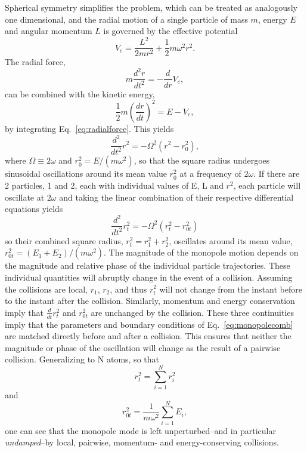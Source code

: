\documentclass[%
 reprint,
 amsmath,amssymb,
 aps,
]{revtex4-1}
\begin{document}
Spherical symmetry simplifies the problem, which can be treated as analogously one dimensional, and the radial motion of a single particle of mass $m$, energy $E$ and angular momentum $L$ is governed by the effective potential
\begin{equation}
V_e = \frac{L^2}{2mr^2}+\frac{1}{2}m\omega^2r^2.
\end{equation}
The radial force,
\begin{equation}
m\frac{d^2r}{dt^2} = -\frac{d}{dr}V_e,
\label{eq:radialforce}
\end{equation}
can be combined with the kinetic energy,
\begin{equation}
\frac{1}{2}m\left(\frac{dr}{dt}\right)^2 = E-V_e,
\end{equation}
by integrating Eq.~\ref{eq:radialforce}. This yields
\begin{equation}
\frac{d^2}{dt^2}r^2 = -\Omega^2\left(r^2-r_0^2\right),
\end{equation}
where $\Omega\equiv2\omega$ and $r_0^2=E/(m\omega^2)$, so that the square radius undergoes sinusoidal oscillations around its mean value $r_0^2$ at a frequency of $2\omega$. If there are 2 particles, 1 and 2, each with individual values of E, L and $r^2$, each particle will oscillate at $2\omega$ and taking the linear combination of their respective differential equations yields
\begin{equation}
\frac{d^2}{dt^2}r_t^2 = -\Omega^2\left(r_t^2-r_{0t}^2\right)
\label{eq:monopolecomb}
\end{equation}
so their combined square radius, $r_t^2 = r_1^2+r_2^2$, oscillates around its mean value, $r_{0t}^2 = (E_1+E_2)/(m\omega^2)$. The magnitude of the monopole motion depends on the magnitude and relative phase of the individual particle trajectories. These individual quantities will abruptly change in the event of a collision. Assuming the collisions are local, $r_1$, $r_2$, and thus $r_t^2$ will not change from the instant before to the instant after the collision. Similarly, momentum and energy conservation imply that $\frac{d}{dt}r_t^2$ and $r_{0t}^2$ are unchanged by the collision. These three continuities imply that the parameters and boundary conditions of Eq.~\ref{eq:monopolecomb} are matched directly before and after a collision. This ensures that neither the magnitude or phase of the oscillation will change as the result of a pairwise collision. Generalizing to N atoms, so that
\begin{equation}
r_t^2 = \sum_{i=1}^Nr_i^2
\end{equation}
and
\begin{equation}
r_{0t}^2 = \frac{1}{m\omega^2}\sum_{i=1}^NE_i,
\end{equation}
one can see that the monopole mode is left unperturbed--and in particular \textit{undamped}--by local, pairwise, momentum- and energy-conserving collisions.
 
\end{document}

